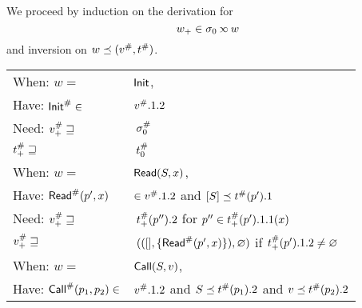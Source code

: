 We proceed by induction on the derivation for
\[w_+\in\ctx_0\semlink w\]
and inversion on $w\preceq({v}^{\#},{t}^{\#})$.
\begin{center}
  \begin{tabular}{|l@{\hskip2pt}l|}
    \hline
    When: \hfill $w=$                                & $\mathsf{Init}$,                                                                                                                                               \\
    Have: \hfill ${\mathsf{Init}}^{\#}\in$                     & ${v}^{\#}.1.2$                                                                                                                                           \\
    Need: \hfill ${v}^{\#}_+\sqsupseteq$              & $\:{\sigma}^{\#}_0$                                                                                                                                          \\
    \hfill ${t}^{\#}_+\sqsupseteq$                 & $\:{t}^{\#}_0$                                                                                                                                        \\
    \hline
    When: \hfill $w=$                                & $\mathsf{Read}(S,x)$,                                                                                                                                     \\
    Have: \hfill ${\mathsf{Read}}^{\#}(p',x)$                  & $\in{v}^{\#}.1.2$ and $[S]\preceq{t}^{\#}(p').1$                                                                                                  \\
    Need: \hfill ${v}^{\#}_+\sqsupseteq$              & $\:{t}^{\#}_+(p'').2$                                                             \hfill for $p''\in{t}^{\#}_+(p').1.1(x)$                          \\
    \hfill ${v}^{\#}_+\sqsupseteq$                    & $\:(([],\{{\mathsf{Read}}^{\#}(p',x)\}),\varnothing)$                                         \hfill if ${t}^{\#}_+(p').1.2\neq\varnothing$                     \\
    \hline
    When: \hfill $w=$                                & $\mathsf{Call}(S,v)$,                                                                                                                                     \\
    Have: \hfill ${\mathsf{Call}}^{\#}(p_1,p_2)\in$            & ${v}^{\#}.1.2$ and $S\preceq{t}^{\#}(p_1).2$ and $v\preceq{t}^{\#}(p_2).2$                                                                      \\

\end{tabular}
\end{center}

